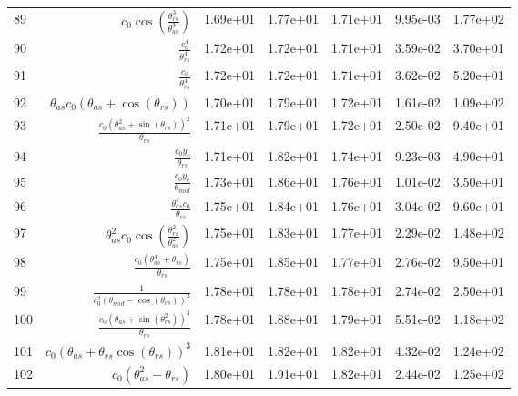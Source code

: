 \begin{tabularx}{\textwidth}{lRRRRRl}
89  &  $ c_{0} \cos{\left(\displaystyle\frac{\theta_{rs}^{3}}{\theta_{as}^{3}} \right)} $  &  1.69e+01  &  1.77e+01  &  1.71e+01  &  9.95e-03  &  1.77e+02  \\ 
90  &  $ \displaystyle\frac{c_{0}^{4}}{\theta_{rs}^{4}} $  &  1.72e+01  &  1.72e+01  &  1.71e+01  &  3.59e-02  &  3.70e+01  \\ 
91  &  $ \displaystyle\frac{c_{0}}{\theta_{rs}^{4}} $  &  1.72e+01  &  1.72e+01  &  1.71e+01  &  3.62e-02  &  5.20e+01  \\ 
92  &  $ \theta_{as} c_{0} \left(\theta_{as} + \cos{\left(\theta_{rs} \right)}\right) $  &  1.70e+01  &  1.79e+01  &  1.72e+01  &  1.61e-02  &  1.09e+02  \\ 
93  &  $ \displaystyle\frac{c_{0} \left(\theta_{as}^{2} + \sin{\left(\theta_{rs} \right)}\right)^{2}}{\theta_{rs}} $  &  1.71e+01  &  1.79e+01  &  1.72e+01  &  2.50e-02  &  9.40e+01  \\ 
94  &  $ \displaystyle\frac{c_{0} y_c}{\theta_{rs}} $  &  1.71e+01  &  1.82e+01  &  1.74e+01  &  9.23e-03  &  4.90e+01  \\ 
95  &  $ \displaystyle\frac{c_{0} y_c}{\theta_{mid}} $  &  1.73e+01  &  1.86e+01  &  1.76e+01  &  1.01e-02  &  3.50e+01  \\ 
96  &  $ \displaystyle\frac{\theta_{as}^{4} c_{0}}{\theta_{rs}} $  &  1.75e+01  &  1.84e+01  &  1.76e+01  &  3.04e-02  &  9.60e+01  \\ 
97  &  $ \theta_{as}^{2} c_{0} \cos{\left(\displaystyle\frac{\theta_{rs}^{2}}{\theta_{as}^{2}} \right)} $  &  1.75e+01  &  1.83e+01  &  1.77e+01  &  2.29e-02  &  1.48e+02  \\ 
98  &  $ \displaystyle\frac{c_{0} \left(\theta_{as}^{4} + \theta_{rs}\right)}{\theta_{rs}} $  &  1.75e+01  &  1.85e+01  &  1.77e+01  &  2.76e-02  &  9.50e+01  \\ 
99  &  $ \displaystyle\frac{1}{c_{0}^{2} \left(\theta_{mid} - \cos{\left(\theta_{rs} \right)}\right)^{2}} $  &  1.78e+01  &  1.78e+01  &  1.78e+01  &  2.74e-02  &  2.50e+01  \\ 
100  &  $ \displaystyle\frac{c_{0} \left(\theta_{as} + \sin{\left(\theta_{rs}^{2} \right)}\right)^{3}}{\theta_{rs}} $  &  1.78e+01  &  1.88e+01  &  1.79e+01  &  5.51e-02  &  1.18e+02  \\ 
101  &  $ c_{0} \left(\theta_{as} + \theta_{rs} \cos{\left(\theta_{rs} \right)}\right)^{3} $  &  1.81e+01  &  1.82e+01  &  1.82e+01  &  4.32e-02  &  1.24e+02  \\ 
102  &  $ c_{0} \left(\theta_{as}^{2} - \theta_{rs}\right) $  &  1.80e+01  &  1.91e+01  &  1.82e+01  &  2.44e-02  &  1.25e+02  \\ 

\end{tabularx}
